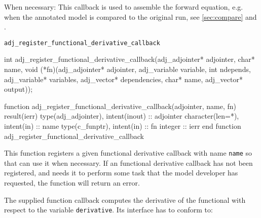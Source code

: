 When necessary: 
This callback is used to assemble the forward equation, e.g. when the annotated model is compared to the original run, see \autoref{sec:compare} and .


\begin{boxwithtitle}{\texttt{adj_register_functional_derivative_callback}}
\begin{minipage}{\columnwidth}
\begin{ccode}
  int adj_register_functional_derivative_callback(adj_adjointer* adjointer, 
                      char* name, 
                      void (*fn)(adj_adjointer* adjointer, 
                                 adj_variable variable, int ndepends, 
                                 adj_variable* variables, adj_vector* dependencies, 
                                 char* name, adj_vector* output));
\end{ccode}
\begin{fortrancode}
  function adj_register_functional_derivative_callback(adjointer, name, fn) 
      result(ierr)
    type(adj_adjointer), intent(inout) :: adjointer
    character(len=*), intent(in) :: name
    type(c_funptr), intent(in) :: fn
    integer :: ierr
  end function adj_register_functional_derivative_callback
\end{fortrancode}
\end{minipage}
\end{boxwithtitle}
This function registers a given functional derivative callback with name \texttt{name} so that \libadjoint can use
it when necessary. 
If an functional derivative callback has not been registered, and \libadjoint needs it to perform some task that the model developer has
requested, the function will return an  error.

The supplied function callback computes the derivative of the functional with respect to the variable \texttt{derivative}. 
Its interface has to conform to:

